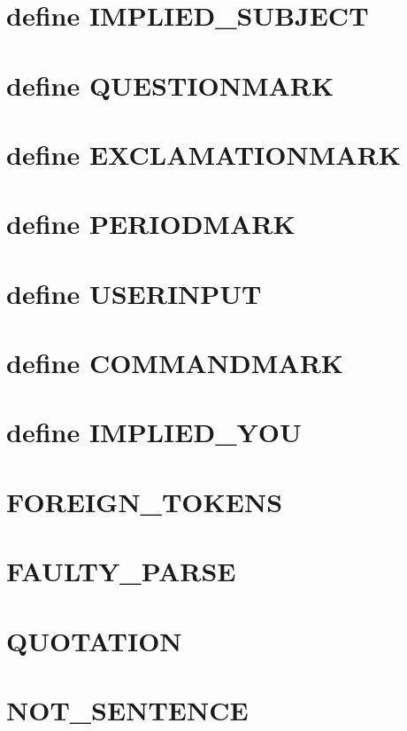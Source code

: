 \documentclass[]{article}
\begin{document}
\section{define IMPLIED\_SUBJECT}\label{define-implied_subject}

\section{define QUESTIONMARK}\label{define-questionmark}

\section{define EXCLAMATIONMARK}\label{define-exclamationmark}

\section{define PERIODMARK}\label{define-periodmark}

\section{define USERINPUT}\label{define-userinput}

\section{define COMMANDMARK}\label{define-commandmark}

\section{define IMPLIED\_YOU}\label{define-implied_you}

\section{FOREIGN\_TOKENS}\label{foreign_tokens}

\section{FAULTY\_PARSE}\label{faulty_parse}

\section{QUOTATION}\label{quotation}

\section{NOT\_SENTENCE}\label{not_sentence}
\end{document}
